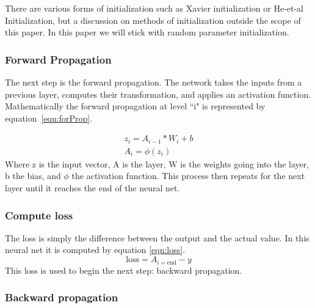 \documentclass[12pt]{article}
\begin{document}
	There are various forms of initialization such as Xavier initialization or He-et-al Initialization, but a discussion on methods of initialization outside the scope of this paper. In this paper we will stick with random parameter initialization. 
	
	

	\subsubsection{Forward Propagation}
	The next step is the forward propagation. The network takes the inputs from a previous layer, computes their transformation, and applies an activation function. Mathematically the forward propagation at level ``i" is represented by equation~\ref{eqn:forProp}.\par  
	\begin{equation}
	\begin{aligned}
	z_i = A_{i-1}* W_{i}+b\\
	A_i=\phi(z_i)
	\end{aligned}
	\label{eqn:forProp}
	\end{equation}
	Where z is the input vector, A is the layer, W is the weights going into the layer, b the bias, and $\phi$ the activation function. This process then repeats for the next layer until it reaches the end of the neural net.
	
	\subsubsection{Compute loss}
	The loss is simply the difference between the output and the actual value. In this neural net it is computed by equation \ref{eqn:loss}.
	\begin{equation}
	\text{loss}=A_{i=\text{end}}-y
	\label{eqn:loss}
	\end{equation}
	This loss is used to begin the next step: backward propagation.
	\subsubsection{Backward propagation}
	
\end{document}
